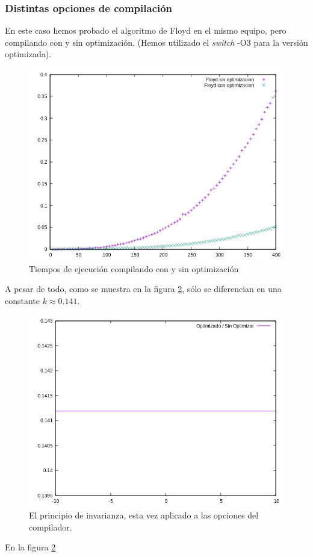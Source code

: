 \documentclass{article}
\begin{document}
\subsubsection{Distintas opciones de compilación}
En este caso hemos probado el algoritmo de Floyd en el mismo equipo, pero compilando con y sin optimización. (Hemos utilizado el \textit{switch} -O3 para la versión optimizada).

\begin{figure}[H]
	\centering
	\includegraphics[totalheight=8cm]{img/optimizacion_floyd}
	\caption{Tiempos de ejecución compilando con y sin optimización}
	\label{fig:optimizacion_floyd}
\end{figure}

A pesar de todo, como se muestra en la figura \ref{fig:optimizacion_cociente}, sólo se diferencian en una constante $k \approx 0.141 $.
\begin{figure}[H]
	\centering
	\includegraphics[totalheight=8cm]{img/optimizacion_cociente}
	\caption{El principio de invarianza, esta vez aplicado a las opciones del compilador.}
	\label{fig:optimizacion_cociente}
\end{figure}
En la figura \ref{fig:optimizacion_cociente}
\end{document}
